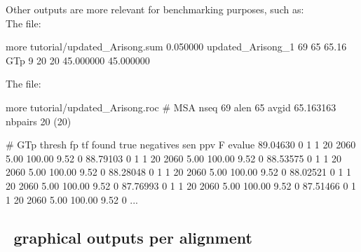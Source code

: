 Other outputs are more relevant for benchmarking purposes, such as:\\
The  file:

\begin{sreoutput}
more tutorial/updated_Arisong.sum 
0.050000        updated_Arisong_1       69      65      65.16    GTp 9 20 20 45.000000 45.000000 
\end{sreoutput}

The  file:
\begin{sreoutput}
more tutorial/updated_Arisong.roc
# MSA nseq 69 alen 65 avgid 65.163163 nbpairs 20 (20)

# GTp thresh fp tf found true negatives sen ppv F evalue
89.04630 0 1 1 20 2060 5.00 100.00 9.52 0
88.79103 0 1 1 20 2060 5.00 100.00 9.52 0
88.53575 0 1 1 20 2060 5.00 100.00 9.52 0
88.28048 0 1 1 20 2060 5.00 100.00 9.52 0
88.02521 0 1 1 20 2060 5.00 100.00 9.52 0
87.76993 0 1 1 20 2060 5.00 100.00 9.52 0
87.51466 0 1 1 20 2060 5.00 100.00 9.52 0
...
\end{sreoutput}


\subsection{\rscape\, graphical outputs per alignment}



